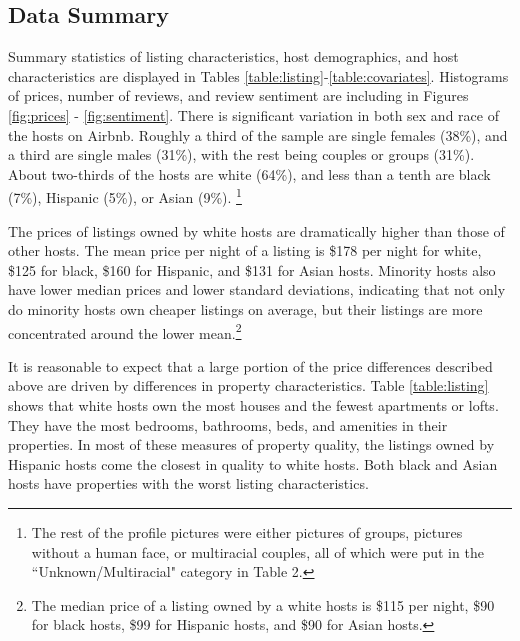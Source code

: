 \subsection{Data Summary}
	\label{summary}
Summary statistics of listing characteristics, host demographics, and host characteristics are displayed in Tables \ref{table:listing}-\ref{table:covariates}. Histograms of prices, number of reviews, and review sentiment are including in Figures \ref{fig:prices} - \ref{fig:sentiment}. There is significant variation in both sex and race of the hosts on Airbnb. Roughly a third of the sample are single females (38\%), and a third are single males (31\%), with the rest being couples or groups (31\%). About two-thirds of the hosts are white (64\%), and less than a tenth are black (7\%), Hispanic (5\%), or Asian (9\%).%
	\footnote{The rest of the profile pictures were either pictures of groups, pictures without a human face, or multiracial couples, all of which were put in the ``Unknown/Multiracial" category in Table 2.} 

The prices of listings owned by white hosts are dramatically higher than those of other hosts. The mean price per night of a listing is \$178 per night for white, \$125 for black, \$160 for Hispanic, and \$131 for Asian hosts. Minority hosts also have lower median prices and lower standard deviations, indicating that not only do minority hosts own cheaper listings on average, but their listings are more concentrated around the lower mean.\footnote{The median price of a listing owned by a white hosts is \$115 per night, \$90 for black hosts, \$99 for Hispanic hosts, and \$90 for Asian hosts.} 

It is reasonable to expect that a large portion of the price differences described above are driven by differences in property characteristics. Table \ref{table:listing} shows that white hosts own the most houses and the fewest apartments or lofts. They have the most bedrooms, bathrooms, beds, and amenities in their properties. In most of these measures of property quality, the listings owned by Hispanic hosts come the closest in quality to white hosts. Both black and Asian hosts have properties with the worst listing characteristics. 

